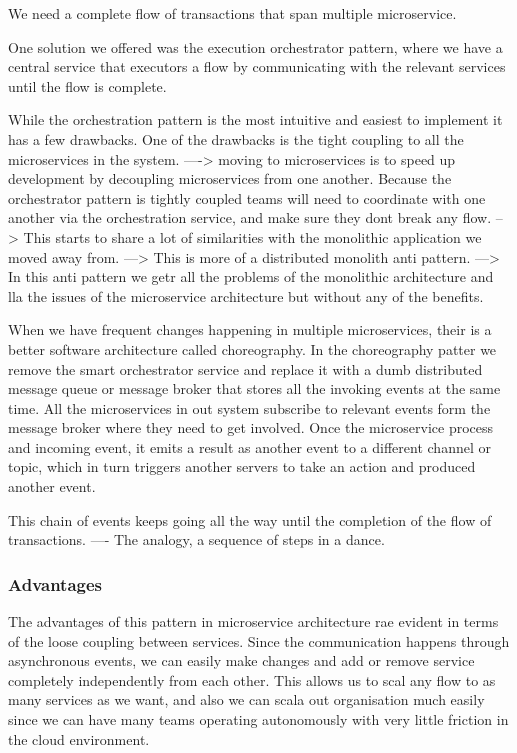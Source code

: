 We need a complete flow of transactions that span multiple microservice.

One solution we offered was the execution orchestrator pattern, where we have a central service that executors a flow by communicating with the relevant services until the flow is complete.

While the orchestration pattern is the most intuitive and easiest to implement it has a few drawbacks.
One of the drawbacks is the tight coupling to all the microservices in the system.
----> moving to microservices is to speed up development by decoupling microservices from one another.
Because the orchestrator pattern is tightly coupled teams will need to coordinate with one another via the orchestration service, and make sure they dont break any flow.
--> This starts to share a lot of similarities with the monolithic application we moved away from.
---> This is more of a distributed monolith anti pattern.
---> In this anti pattern we getr all the problems of the monolithic architecture and lla the issues of the microservice architecture but without any of the benefits.

When we have frequent changes happening in multiple microservices, their is a better software architecture called choreography.
In the choreography patter we remove the smart orchestrator service and replace it with a dumb distributed message queue or message broker that stores all the invoking events at the same time.
All the microservices in out system subscribe to relevant events form the message broker where they need to get involved.
Once the microservice process and incoming event, it emits a result as another event to a different channel or topic, which in turn triggers another servers to take an action and produced another event.

This chain of events keeps going all the way until the completion of the flow of transactions.
---- The analogy, a sequence of steps in a dance.

\subsubsection{Advantages}
The advantages of this pattern in microservice architecture rae evident in terms of the loose coupling between services.
Since the communication happens through asynchronous events, we can easily make changes and add or remove service completely independently from each other.
This allows us to scal any flow to as many services as we want, and also we can scala out organisation much easily since we can have many teams operating autonomously with very little friction in the cloud environment.

